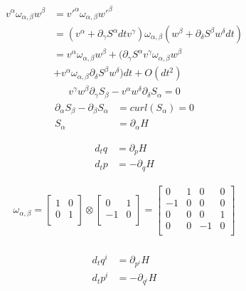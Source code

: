 \documentclass[aps,pra,10pt,twocolumn,floatfix,nofootinbib]{revtex4-1}
\theoremstyle{definition}
\begin{document}
\begin{align*}
v^{\alpha} \omega_{\alpha, \beta} w^{\beta} &= v'^{\alpha} \omega_{\alpha, \beta} w'^{\beta}  \\
&= (v^{\alpha} + \partial_{\gamma} S^{\alpha} dt v^{\gamma}) \omega_{\alpha, \beta} ( w^{\beta} + \partial_{\delta} S^{\beta} w^{\delta} dt) \\
&= v^{\alpha} \omega_{\alpha, \beta} w^{\beta} + (\partial_{\gamma} S^{\alpha} v^{\gamma} \omega_{\alpha, \beta} w^{\beta} \\
 &+ v^{\alpha} \omega_{\alpha, \beta} \partial_{\delta} S^{\beta} w^{\delta}) dt + O(dt^2)
\end{align*}
\begin{align*}
v^{\gamma} w^{\beta} \partial_{\gamma} S_{\beta} - v^{\alpha} w^{\delta} \partial_{\delta} S_{\alpha} = 0
\end{align*}
\begin{align*}
\partial_{\alpha} S_{\beta} - \partial_{\beta} S_{\alpha} &= curl(S_{\alpha}) = 0 \\
S_{\alpha} &= \partial_{\alpha}H
\end{align*}

\begin{align*}
d_{t}q &= \partial_{p} H \\
d_{t}p &= - \partial_{q} H
\end{align*}

\begin{align*}
\omega_{\alpha, \beta} =  \left[
  \begin{array}{cc}
    1 & 0 \\
    0 & 1 \\
  \end{array}
\right] \otimes \left[
  \begin{array}{cc}
    0 & 1 \\
    -1 & 0 \\
  \end{array}
\right] =
\left[
  \begin{array}{cccc}
    0 & 1 & 0 & 0 \\
    -1 & 0 & 0 & 0 \\
    0 & 0 & 0 & 1 \\
    0 & 0 & -1 & 0 \\
  \end{array}
\right] \\
\end{align*}

\begin{align*}
d_{t}q^i &= \partial_{p^i} H \\
d_{t}p^i &= - \partial_{q^i} H
\end{align*}
\end{document}
